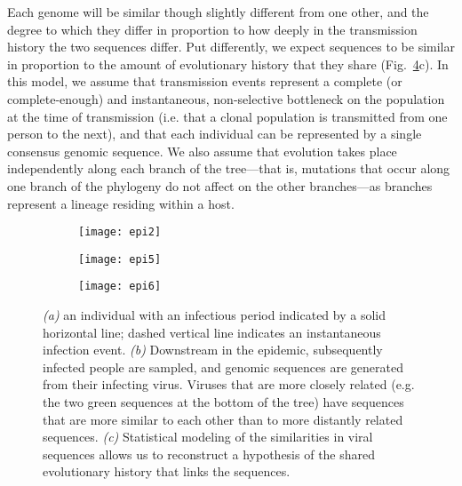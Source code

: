 Each genome will be similar though slightly different from one other, and the degree to which they differ in proportion to how deeply in the transmission history the two sequences differ.
Put differently, we expect sequences to be similar in proportion to the amount of evolutionary history that they share (Fig.~\ref{fig:epiProcess}c).
In this model, we assume that transmission events represent a complete (or complete-enough) and instantaneous, non-selective bottleneck on the population at the time of transmission (i.e. that a clonal population is transmitted from one person to the next), and that each individual can be represented by a single consensus genomic sequence.
We also assume that evolution takes place independently along each branch of the tree---that is, mutations that occur along one branch of the phylogeny do not affect on the other branches---as branches represent a lineage residing within a host.

\begin{figure}[ht]
  \centering
  \begin{subfigure}{0.45\textwidth}
    \texttt{[image: epi2]}
    \label{fig:epiProcess1}
    \caption{}
  \end{subfigure}
  \begin{subfigure}{0.45\textwidth}
    \texttt{[image: epi5]}
    \label{fig:epiProcess2}
    \caption{}
  \end{subfigure}
  \begin{subfigure}{0.45\textwidth}
    \texttt{[image: epi6]}
    \label{fig:epiProcess3}
    \caption{}
  \end{subfigure}
  \caption[The epidemic process is inherently treelike]{\textit{(a)} an individual with an infectious period indicated by a solid horizontal line; dashed vertical line indicates an instantaneous infection event. \textit{(b)} Downstream in the epidemic, subsequently infected people are sampled, and genomic sequences are generated from their infecting virus. Viruses that are more closely related (e.g. the two green sequences at the bottom of the tree) have sequences that are more similar to each other than to more distantly related sequences. \textit{(c)} Statistical modeling of the similarities in viral sequences allows us to reconstruct a hypothesis of the shared evolutionary history that links the sequences.}
  \label{fig:epiProcess}
\end{figure}


